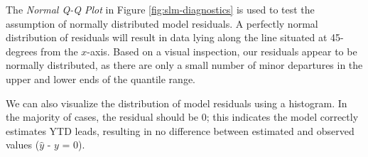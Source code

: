 \documentclass[
]{book}
\newenvironment{Shaded}{\begin{snugshade}}{\end{snugshade}}
\newcommand{\AttributeTok}[1]{\textcolor[rgb]{0.77,0.63,0.00}{#1}}
\newcommand{\CommentTok}[1]{\textcolor[rgb]{0.56,0.35,0.01}{\textit{#1}}}
\newcommand{\FloatTok}[1]{\textcolor[rgb]{0.00,0.00,0.81}{#1}}
\newcommand{\FunctionTok}[1]{\textcolor[rgb]{0.00,0.00,0.00}{#1}}
\newcommand{\NormalTok}[1]{#1}
\newcommand{\SpecialCharTok}[1]{\textcolor[rgb]{0.00,0.00,0.00}{#1}}
\newcommand{\StringTok}[1]{\textcolor[rgb]{0.31,0.60,0.02}{#1}}
\begin{document}
The \emph{Normal Q-Q Plot} in Figure \ref{fig:slm-diagnostics} is used to test the assumption of normally distributed model residuals. A perfectly normal distribution of residuals will result in data lying along the line situated at 45-degrees from the \(x\)-axis. Based on a visual inspection, our residuals appear to be normally distributed, as there are only a small number of minor departures in the upper and lower ends of the quantile range.

We can also visualize the distribution of model residuals using a histogram. In the majority of cases, the residual should be 0; this indicates the model correctly estimates YTD leads, resulting in no difference between estimated and observed values (\(\hat{y}\) - \(y\) = 0).

\begin{Shaded}
\end{Shaded}
\end{document}
